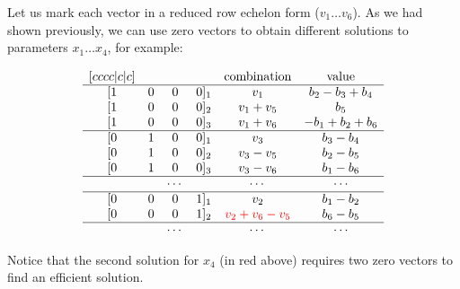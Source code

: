 Let us mark each vector in a reduced row echelon form ($v_1 \ldots v_6$). As we had shown previously, we can use zero vectors to obtain different solutions to parameters $x_1 \ldots x_4$, for example:

\begin{equation}
\begin{matrix}[cccc|c|c]
    & & & & \mbox{combination} & \mbox{value} \\
    \hline
    [1 & 0 & 0 & 0]_1 & v_1 & b_2-b_3+b_4 \\
    [1 & 0 & 0 & 0]_2 & v_1+v_5 & b_5 \\
    [1 & 0 & 0 & 0]_3 & v_1+v_6 & -b_1 + b_2 + b_6 \\
    \hline
    [0 & 1 & 0 & 0]_1 & v_3 & b_3 - b_4 \\
    [0 & 1 & 0 & 0]_2 & v_3 - v_5 & b_2 - b_5 \\
    [0 & 1 & 0 & 0]_3 & v_3 - v_6 & b_1 - b_6 \\
    \hline
    & & \cdots & & \cdots & \cdots \\
    \hline
    [0 & 0 & 0 & 1]_1 & v_2 & b_1 - b_2 \\
    [0 & 0 & 0 & 1]_2 & \textcolor{red}{v_2  + v_6 - v_5}& b_6 - b_5 \\
    \hline
    & & \cdots & & \cdots & \cdots \\
\end{matrix}
\end{equation}

Notice that the second solution for $x_4$ (in red above) requires two zero vectors to find an efficient solution.

